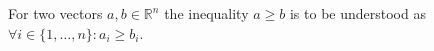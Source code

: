 For two vectors $a,b \in \mathbb{R}^n$ the inequality $a \geq b$ is to be understood as $\forall i \in \{1, \dots, n\} : a_i \geq b_i$.
